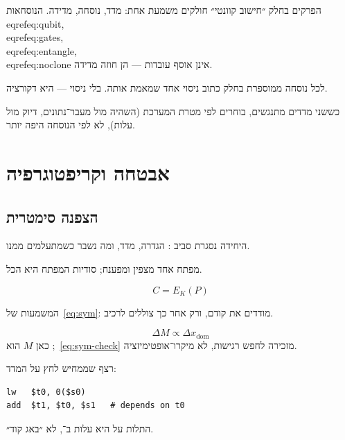 הפרקים בחלק ״חישוב קוונטי״ חולקים משמעת אחת: מדד, נוסחה, מדידה.
הנוסחאות \\eqref{eq:qubit}, \\eqref{eq:gates}, \\eqref{eq:entangle}, \\eqref{eq:noclone} אינן אוסף עובדות — הן חוזה מדידה.

\begin{keybox}[frametitle={חוזה החלק}]
לכל נוסחה ממוספרת בחלק כתוב ניסוי אחד שמאמת אותה. בלי ניסוי — היא דקורציה.
\end{keybox}

כששני מדדים מתנגשים, בוחרים לפי מטרת המערכת (השהיה מול מעבר־נתונים, דיוק מול עלות),
לא לפי הנוסחה היפה יותר.

\part{אבטחה וקריפטוגרפיה}

\chapter{הצפנה סימטרית}
\label{ch:sym}

היחידה נסגרת סביב : הגדרה, מדד, ומה נשבר כשמתעלמים ממנו.

\begin{defbox}[frametitle={הגדרה — הצפנה סימטרית}]
מפתח אחד מצפין ומפענח; סודיות המפתח היא הכל.
\end{defbox}

\begin{equation}
\label{eq:sym}
C = E_K(P)
\end{equation}

המשמעות של~\eqref{eq:sym}: מודדים את  קודם, ורק אחר כך צוללים לרכיב.

\begin{equation}
\label{eq:sym-check}
\Delta M \propto \Delta x_{\mathrm{dom}}
\end{equation}
כאן $M$ הוא ;~\eqref{eq:sym-check} מזכירה לחפש רגישות, לא מיקרו־אופטימיזציה.

רצף שממחיש לחץ על המדד:
\begin{asmblock}
\begin{lstlisting}[style=asm]
lw   $t0, 0($s0)
add  $t1, $t0, $s1   # depends on t0
\end{lstlisting}
\end{asmblock}
התלות על  היא עלות ב־, לא ״באג קוד״.

